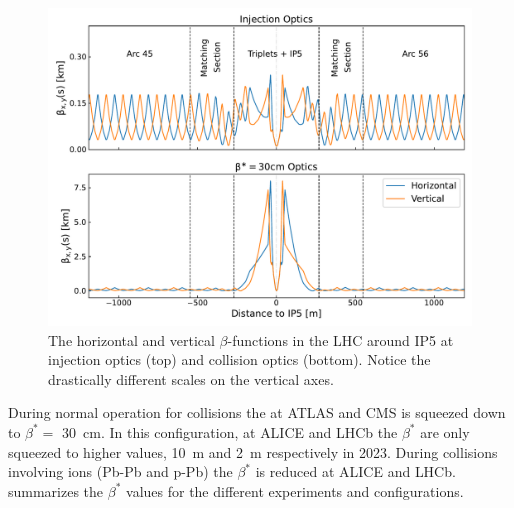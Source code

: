 \begin{figure}[!hbt]
  \centering
  \includegraphics*[width=\linewidth]{Figures/Optics_Measurements_Corrections_at_LHC/ir5_surroundings_optics_2.pdf}
  \caption{The horizontal and vertical \(\beta\)-functions in the LHC around IP5 at injection optics (top) and collision optics (bottom). Notice the drastically different scales on the vertical axes.}
  \label{figure:ir5_and_around}
\end{figure}

During normal operation for collisions the  at \acrshort{ATLAS} and \acrshort{CMS} is squeezed down to \(\beta^{\ast} =\) \qty{30}{\centi\metre}.
In this configuration, at \acrshort{ALICE} and \acrshort{LHCb} the \(\beta^{\ast}\) are only squeezed to higher values, \qty{10}{\meter} and \qty{2}{\meter} respectively in \num{2023}.
During collisions involving ions (Pb-Pb and p-Pb) the \(\beta^{\ast}\) is reduced at \acrshort{ALICE} and \acrshort{LHCb}.
 summarizes the \(\beta^{\ast}\) values for the different experiments and configurations.

